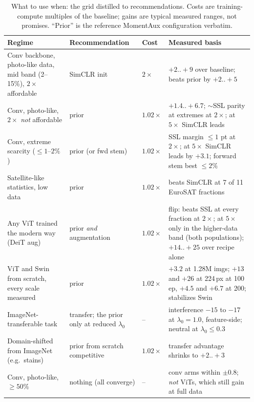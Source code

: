 \begin{table}[pos=htbp]
\caption{What to use when: the grid distilled to recommendations. Costs
are training-compute multiples of the baseline; gains are typical measured
ranges, not promises. ``Prior'' is the reference MomentAux configuration
verbatim.}
\label{tab:guide}
\centering\scriptsize
\setlength{\tabcolsep}{2.6pt}
\begin{tabularx}{\columnwidth}{@{}P{0.255\columnwidth}P{0.205\columnwidth}lX@{}}
\toprule
Regime & Recommendation & Cost & Measured basis \\
\midrule
Conv backbone, photo-like data, mid band (2--15\%), $2\times$ affordable & SimCLR init & $2\times$ & $+2..{+}9$ over baseline; beats prior by $+2..{+}5$ \\
Conv, photo-like, $2\times$ \emph{not} affordable & prior & $1.02\times$ & $+1.4..{+}6.7$; ${\sim}$SSL parity at extremes at $2\times$; at $5\times$ SimCLR leads \\
Conv, extreme scarcity (${\leq}1$--$2\%$) & prior (or fwd stem) & $1.02\times$ & SSL margin ${\leq}1$ pt at $2\times$; at $5\times$ SimCLR leads by $+3.1$; forward stem best ${\leq}2\%$ \\
Satellite-like statistics, low data & prior & $1.02\times$ & beats SimCLR at 7 of 11 EuroSAT fractions \\
Any ViT trained the modern way (DeiT aug) & prior \emph{and} augmentation & $1.02\times$ & flip: beats SSL at every fraction at $2\times$; at $5\times$ only in the higher-data band (both populations); $+14..{+}25$ over recipe alone \\
ViT and Swin from scratch, every scale measured & prior & $1.02\times$ & $+3.2$ at 1.28M imgs; $+13$ and $+26$ at 224\,px at 100 ep, $+4.5$ and $+6.7$ at 200; stabilizes Swin \\
ImageNet-transferable task & transfer; the prior only at reduced $\lambda_0$ &--& interference $-15$ to $-17$ at $\lambda_0{=}1.0$, feature-side; neutral at $\lambda_0 {\leq} 0.3$ \\
Domain-shifted from ImageNet (e.g.\ stains) & prior from scratch competitive & $1.02\times$ & transfer advantage shrinks to $+2..{+}3$ \\
Conv, photo-like, ${\geq}50\%$ & nothing (all converge) &--& conv arms within $\pm 0.8$; \emph{not} ViTs, which still gain at full data \\
\bottomrule
\end{tabularx}
\end{table}

